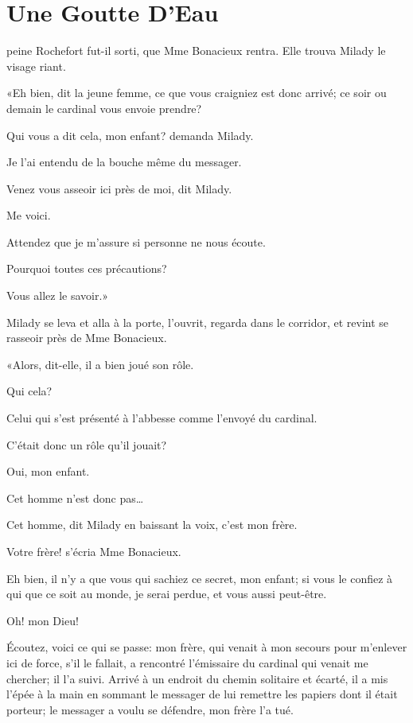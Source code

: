 
\chapter{Une Goutte D'Eau} 

\lettrine{}{} peine Rochefort fut-il sorti, que Mme Bonacieux rentra. Elle trouva Milady le visage riant. 

\zz
«Eh bien, dit la jeune femme, ce que vous craigniez est donc arrivé; ce soir ou demain le cardinal vous envoie prendre? 

\speak  Qui vous a dit cela, mon enfant? demanda Milady. 

\speak  Je l'ai entendu de la bouche même du messager. 

\speak  Venez vous asseoir ici près de moi, dit Milady. 

\speak  Me voici. 

\speak  Attendez que je m'assure si personne ne nous écoute. 

\speak  Pourquoi toutes ces précautions? 

\speak  Vous allez le savoir.» 

Milady se leva et alla à la porte, l'ouvrit, regarda dans le corridor, et revint se rasseoir près de Mme Bonacieux. 

«Alors, dit-elle, il a bien joué son rôle. 

\speak  Qui cela? 

\speak  Celui qui s'est présenté à l'abbesse comme l'envoyé du cardinal. 

\speak  C'était donc un rôle qu'il jouait? 

\speak  Oui, mon enfant. 

\speak  Cet homme n'est donc pas\dots 

\speak  Cet homme, dit Milady en baissant la voix, c'est mon frère. 

\speak  Votre frère! s'écria Mme Bonacieux. 

\speak  Eh bien, il n'y a que vous qui sachiez ce secret, mon enfant; si vous le confiez à qui que ce soit au monde, je serai perdue, et vous aussi peut-être. 

\speak  Oh! mon Dieu! 

\speak  Écoutez, voici ce qui se passe: mon frère, qui venait à mon secours pour m'enlever ici de force, s'il le fallait, a rencontré l'émissaire du cardinal qui venait me chercher; il l'a suivi. Arrivé à un endroit du chemin solitaire et écarté, il a mis l'épée à la main en sommant le messager de lui remettre les papiers dont il était porteur; le messager a voulu se défendre, mon frère l'a tué. 

